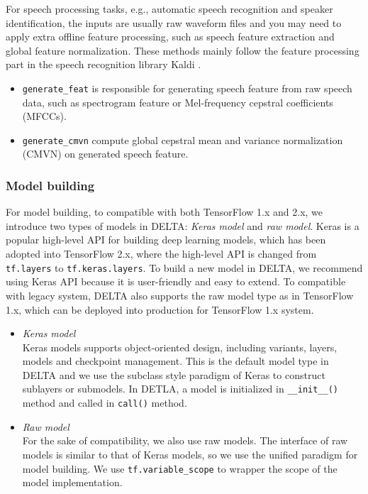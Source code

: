 \documentclass{article}
\begin{document}
    For speech processing tasks, e.g., automatic speech recognition and speaker identification, the inputs are usually raw waveform files and you may need to apply extra offline feature processing, such as speech feature extraction and global feature normalization. These methods mainly follow the feature processing part in the speech recognition library Kaldi \citep{Povey_ASRU2011}.

    \begin{itemize}
        \item \texttt{generate_feat} is responsible for generating speech feature from raw speech data, such as spectrogram feature or Mel-frequency cepstral coefficients (MFCCs).
        \item \texttt{generate_cmvn} compute global cepstral mean and variance normalization (CMVN) on generated speech feature.
    \end{itemize}


\subsubsection{Model building}
For model building, to compatible with both TensorFlow 1.x and 2.x, we introduce two types of models in DELTA: \textit{Keras model} and \textit{raw model}. Keras \citep{chollet2015keras} is a popular high-level API for building deep learning models, which has been adopted into TensorFlow 2.x, where the high-level API is changed from \texttt{tf.layers} to \texttt{tf.keras.layers}. To build a new model in DELTA, we recommend using Keras API because it is user-friendly and easy to extend. To compatible with legacy system, DELTA also supports the raw model type as in TensorFlow 1.x, which can be deployed into production for TensorFlow 1.x system.

    \begin{itemize}
        \item \textit{Keras model} \\
        Keras models supports object-oriented design, including variants, layers, models and checkpoint management. This is the default model type in DELTA and we use the subclass style paradigm of Keras to construct sublayers or submodels. In DETLA, a model is initialized in \texttt{__init__()} method and called in \texttt{call()} method. 

        \item \textit{Raw model} \\
        For the sake of compatibility, we also use raw models. The interface of raw models is similar to that of Keras models, so we use the unified paradigm for model building. We use \texttt{tf.variable_scope} to wrapper the scope of the model implementation.
    \end{itemize}
\end{document}
